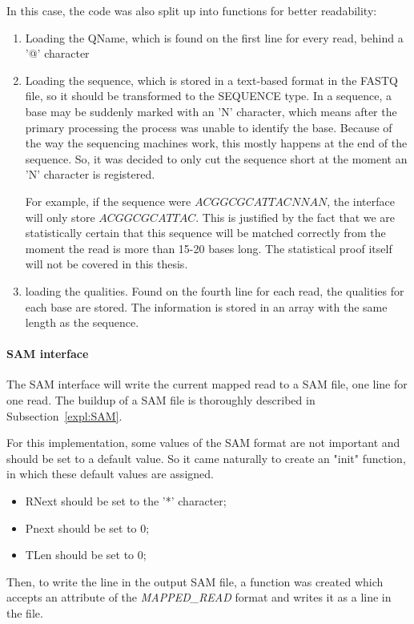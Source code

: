 In this case, the code was also split up into functions for better readability:
\begin{enumerate}
	\item Loading the QName, which is found on the first line for every read, behind a '@' character
	\item Loading the sequence, which is stored in a text-based format in the FASTQ file, so it should be transformed to the SEQUENCE type. In a sequence, a base may be suddenly marked with an 'N' character, which means after the primary processing the process was unable to identify the base. Because of the way the sequencing machines work, this mostly happens at the end of the sequence. So, it was decided to only cut the sequence short at the moment an 'N' character is registered.
	
	For example, if the sequence were $ACGGCGCATTACNNAN$, the interface will only store $ACGGCGCATTAC$. This is justified by the fact that we are statistically certain that this sequence will be matched correctly from the moment the read is more than 15-20 bases long. The statistical proof itself will not be covered in this thesis.
	\item loading the qualities. Found on the fourth line for each read, the qualities for each base are stored. The information is stored in an array with the same length as the sequence.
\end{enumerate}


\paragraph{SAM interface} The SAM interface will write the current mapped read to a SAM file, one line for one read. The buildup of a SAM file is thoroughly described in Subsection~\ref{expl:SAM}.

For this implementation, some values of the SAM format are not important and should be set to a default value. So it came naturally to create an "init" function, in which these default values are assigned. 
\begin{itemize}
	\item RNext should be set to the '*' character;
	\item Pnext should be set to 0;
	\item TLen should be set to 0;
\end{itemize}

Then, to write the line in the output SAM file, a function was created which accepts an attribute of the \emph{MAPPED\_READ} format and writes it as a line in the file.


